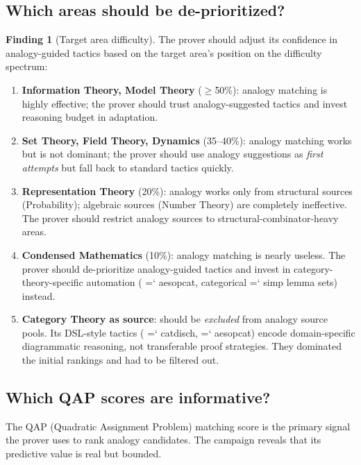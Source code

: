\documentclass[11pt]{article}
\renewcommand{\texttt}[1]{%
  \begingroup\ttfamily\hyphenchar\font=`\-\relax
  \def\_{\textunderscore\discretionary{}{}{}}%
  #1\endgroup}
\theoremstyle{definition}
\newtheorem{finding}[theorem]{Finding}
\theoremstyle{remark}
\begin{document}
\subsection{Which areas should be de-prioritized?}

\begin{finding}[Target area difficulty]%
\label{find:target_difficulty}
The prover should adjust its confidence in analogy-guided tactics
based on the target area's position on the difficulty spectrum:
\begin{enumerate}
\item \textbf{Information Theory, Model Theory} ($\geq$50\%):
  analogy matching is highly effective; the prover should trust
  analogy-suggested tactics and invest reasoning budget in
  adaptation.

\item \textbf{Set Theory, Field Theory, Dynamics} (35--40\%):
  analogy matching works but is not dominant; the prover should
  use analogy suggestions as \emph{first attempts} but fall back
  to standard tactics quickly.

\item \textbf{Representation Theory} (20\%): analogy works only
  from structural sources (Probability); algebraic sources
  (Number Theory) are completely ineffective.  The prover should
  restrict analogy sources to structural-combinator-heavy areas.

\item \textbf{Condensed Mathematics} (10\%): analogy matching is
  nearly useless.  The prover should de-prioritize analogy-guided
  tactics and invest in category-theory-specific automation
  (\texttt{aesop\_cat}, categorical \texttt{simp} lemma sets)
  instead.

\item \textbf{Category Theory as source}: should be \emph{excluded}
  from analogy source pools.  Its DSL-style tactics
  (\texttt{cat\_disch}, \texttt{aesop\_cat}) encode
  domain-specific diagrammatic reasoning, not transferable proof
  strategies.  They dominated the initial rankings and had to be
  filtered out.
\end{enumerate}
\end{finding}

\subsection{Which QAP scores are informative?}

The QAP (Quadratic Assignment Problem) matching score is the
primary signal the prover uses to rank analogy candidates.  The
campaign reveals that its predictive value is real but bounded.
\end{document}
